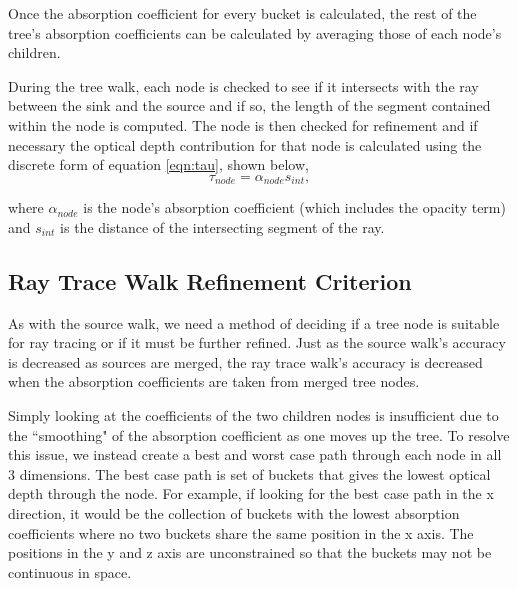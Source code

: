 Once the absorption coefficient for every bucket is calculated, the rest of the tree's absorption coefficients can be calculated by averaging those of each node's children.

During the tree walk, each node is checked to see if it intersects with the ray between the sink and the source and if so, the length of the segment contained within the node is computed. The node is then checked for refinement and if necessary the optical depth contribution for that node is calculated using the discrete form of equation \ref{eqn:tau}, shown below,
\begin{equation}
    \tau_{node} = \alpha_{node} s_{int},
\end{equation}

where $\alpha_{node}$ is the node's absorption coefficient (which includes the opacity term) and $s_{int}$ is the distance of the intersecting segment of the ray.

\subsection{Ray Trace Walk Refinement Criterion}
\label{sec:thickRefine}

As with the source walk, we need a method of deciding if a tree node is suitable for ray tracing or if it must be further refined. Just as the source walk's accuracy is decreased as sources are merged, the ray trace walk's accuracy is decreased when the absorption coefficients are taken from merged tree nodes.

Simply looking at the coefficients of the two children nodes is insufficient due to the ``smoothing" of the absorption coefficient as one moves up the tree. To resolve this issue, we instead create a best and worst case path through each node in all 3 dimensions. The best case path is set of buckets that gives the lowest optical depth through the node. For example, if looking for the best case path in the x direction, it would be the collection of buckets with the lowest absorption coefficients where no two buckets share the same position in the x axis. The positions in the y and z axis are unconstrained so that the buckets may not be continuous in space.

